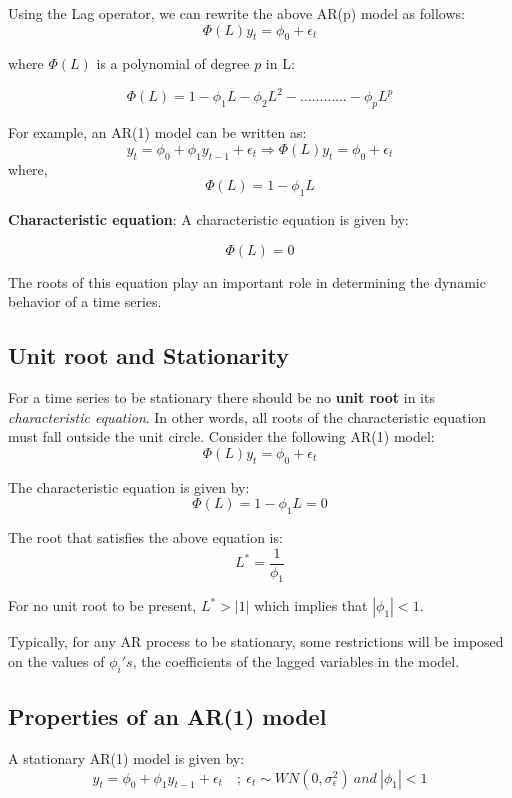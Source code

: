 \documentclass[]{book}
\theoremstyle{definition}
\theoremstyle{definition}
\theoremstyle{definition}
\theoremstyle{remark}
\begin{document}
Using the Lag operator, we can rewrite the above AR(p) model as follows:
\[ \Phi(L)y_t=\phi_0+\epsilon_t \]

where \(\displaystyle \Phi(L)\) is a polynomial of degree \(p\) in L:

\[ \Phi(L) = 1-\phi_1 L - \phi_2 L^2- \ldots\ldots\ldots\ldots -\phi_p L^p\]

For example, an AR(1) model can be written as:
\[y_t=\phi_0+\phi_1 y_{t-1} + \epsilon_t \Rightarrow  \Phi(L)y_t=\phi_0+\epsilon_t\]
where,
\[ \Phi(L) = 1-\phi_1 L \]

\textbf{Characteristic equation}: A characteristic equation is given by:

\[\Phi(L)=0\]

The roots of this equation play an important role in determining the dynamic behavior of a time series.

\hypertarget{unit-root-and-stationarity}{%
\subsection{Unit root and Stationarity}\label{unit-root-and-stationarity}}

For a time series to be stationary there should be no \textbf{unit root} in its \emph{characteristic equation}. In other words, all roots of the characteristic equation must fall outside the unit circle. Consider the following AR(1) model:
\[\Phi(L)y_t = \phi_0 + \epsilon_t\]

The characteristic equation is given by:
\[\Phi(L)=1-\phi_1L=0 \]

The root that satisfies the above equation is:
\[ L^*=\frac{1}{\phi_1}\]

For no unit root to be present, \(L^*>|1|\) which implies that \(|\phi_1|<1\).

Typically, for any AR process to be stationary, some restrictions will be imposed on the values of \(\phi_i's\), the coefficients of the lagged variables in the model.

\hypertarget{properties-of-an-ar1-model}{%
\subsection{Properties of an AR(1) model}\label{properties-of-an-ar1-model}}

A stationary AR(1) model is given by:
\[ y_t=\phi_0 +\phi_1 y_{t-1}+ \epsilon_t \quad ; \ \epsilon_t\sim WN(0, \sigma_\epsilon^2) \ and \  |\phi_1|<1\]
\end{document}
